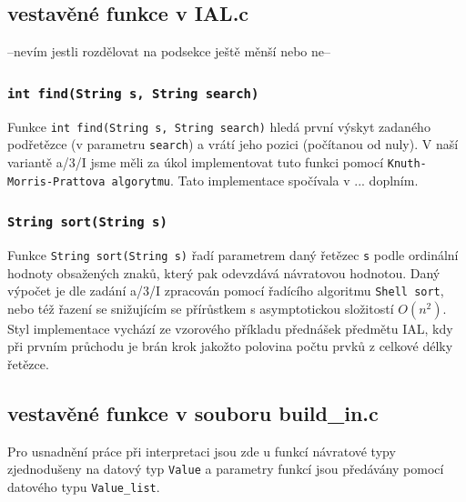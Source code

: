 \documentclass[a4paper,11pt]{article}
\begin{document}
\subsection {vestavěné funkce v IAL.c}
--nevím jestli rozdělovat na podsekce ještě měnší nebo ne--

\subsubsection {\texttt{int find(String s, String search)}}
Funkce \texttt{int find(String s, String search)} hledá první výskyt zadaného podřetězce (v parametru \texttt{search}) a vrátí jeho pozici (počítanou od nuly). V naší variantě a/3/I jsme měli za úkol implementovat tuto funkci pomocí \texttt{Knuth-Morris-Prattova algorytmu}. Tato implementace spočívala v ... doplním.

\subsubsection {\texttt{String sort(String s)}}
Funkce \texttt{String sort(String s)} řadí parametrem daný řetězec \texttt{s} podle ordinální hodnoty obsažených znaků, který pak odevzdává návratovou hodnotou. Daný výpočet je dle zadání a/3/I zpracován pomocí řadícího algoritmu \texttt{Shell sort}, nebo též řazení se snižujícím se přírůstkem s asymptotickou složitostí $O(n^{2})$. Styl implementace vychází ze vzorového příkladu přednášek předmětu IAL, kdy při prvním průchodu je brán krok jakožto polovina počtu prvků z celkové délky řetězce.

\subsection {vestavěné funkce v souboru build{\_}in.c}
Pro usnadnění práce při interpretaci jsou zde u funkcí návratové typy zjednodušeny na datový typ \texttt{Value} a parametry funkcí jsou předávány pomocí datového typu \texttt{Value\_list}.
\end{document}
